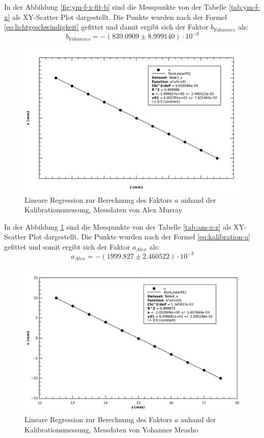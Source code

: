 In der Abbildung \ref{fig:ym-f-x-fit-b} sind  die  Messpunkte  von  der  Tabelle
\ref{tab:ym-f-x}  als  XY-Scatter  Plot  dargestellt. Die Punkte wurden nach der
Formel \ref{eq:lichtgeschwindigkeit} gefittet und damit ergibt sich  der  Faktor
$b_{Yohannes}$ als:
\begin{equation}
    b_{Yohannes} = -(839.0909 \pm 8.999140)\cdot 10^{-9}
    \label{eq:ym-b}
\end{equation}

\begin{figure}[H]
    \center
    \includegraphics[width=.8\textwidth]{images/am-x-z-fit-a.pdf}
    \caption{Lineare Regression zur Berechnung des Faktors $a$ anhand der Kalibrationsmessung, Messdaten von Alex Murray}
    \label{fig:am-x-z-fit-a}
\end{figure}

In der Abbildung \ref{fig:am-x-z-fit-a}  sind  die  Messpunkte  von  der Tabelle
\ref{tab:am-x-z} als XY-Scatter Plot dargestellt.  Die  Punkte  wurden  nach der
Formel  \ref{eq:kalibration-a}   gefittet  und  somit  ergibt  sich  der  Faktor
$a_{Alex}$ als:
\begin{equation}
    a_{Alex} = -(1999.827 \pm 2.460522)\cdot 10^{-3}
    \label{eq:am-a}
\end{equation}

\begin{figure}[H]
    \center
    \includegraphics[width=.8\textwidth]{images/ym-x-z-fit-a.pdf}
    \caption{Lineare Regression zur Berechnung des Faktors $a$ anhand der Kalibrationsmessung, Messdaten von Yohannes Measho}
    \label{fig:ym-x-z-fit-a}
\end{figure}

